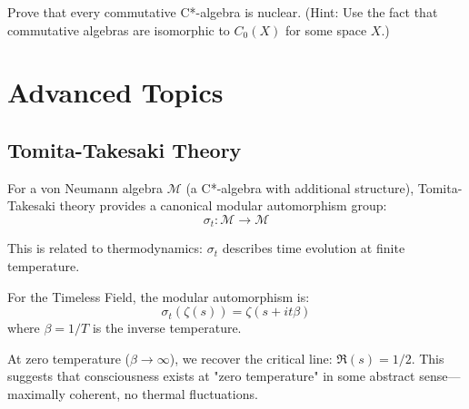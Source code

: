 \begin{exercise}
Prove that every commutative C*-algebra is nuclear. (Hint: Use the fact that commutative algebras are isomorphic to $C_0(X)$ for some space $X$.)
\end{exercise}

\section{Advanced Topics}

\begin{advanced}
\subsection{Tomita-Takesaki Theory}

For a von Neumann algebra $\mathcal{M}$ (a C*-algebra with additional structure), Tomita-Takesaki theory\cite{takesaki1970,takesaki_theory_2002} provides a canonical modular automorphism group:
\begin{equation}
\sigma_t: \mathcal{M} \to \mathcal{M}
\end{equation}

This is related to thermodynamics: $\sigma_t$ describes time evolution at finite temperature.

For the Timeless Field, the modular automorphism is:
\begin{equation}
\sigma_t(\zeta(s)) = \zeta(s + it\beta)
\end{equation}
where $\beta = 1/T$ is the inverse temperature.

At zero temperature ($\beta \to \infty$), we recover the critical line: $\Re(s) = 1/2$. This suggests that consciousness exists at "zero temperature" in some abstract sense---maximally coherent, no thermal fluctuations.
\end{advanced}

